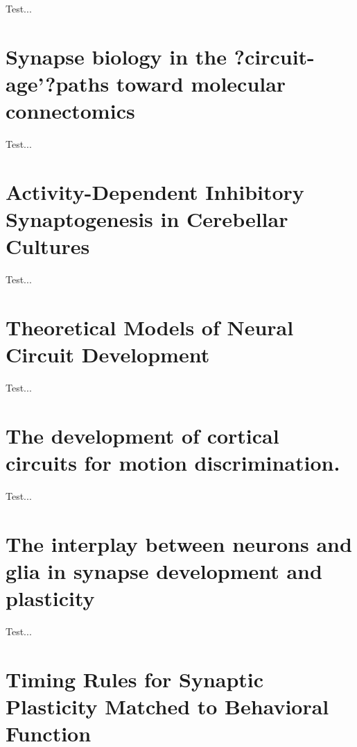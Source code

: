 \documentclass[11pt, a4paper, oneside]{article}   	%
\begin{document}
Test...

\section{Synapse biology in the ?circuit-age'?paths toward molecular connectomics \cite{Schreiner2017}}

Test...

\section{Activity-Dependent Inhibitory Synaptogenesis in Cerebellar Cultures \cite{Seil2016}}

Test...

\section{Theoretical Models of Neural Circuit Development \cite{Simpson2009}}

Test...

\section{The development of cortical circuits for motion discrimination. \cite{Smith2015}}

Test...

\section{The interplay between neurons and glia in synapse development and plasticity \cite{Stogsdill2017}}

Test...

\section{Timing Rules for Synaptic Plasticity Matched to Behavioral Function \cite{Suvrathan2016}}
\end{document}
